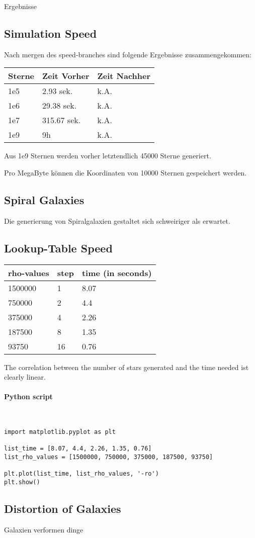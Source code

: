 Ergebnisse

\subsection{Simulation Speed}

Nach mergen des speed-branches sind folgende Ergebnisse zusammengekommen:

\begin{tabular}{l | l | l}

Sterne  & Zeit Vorher   & Zeit Nachher \\ \hline\hline
1e5     & 2.93 sek.     & k.A. \\
1e6     & 29.38 sek.    & k.A. \\
1e7     & 315.67 sek.   & k.A. \\
1e9     & 9h            & k.A. \\

\end{tabular}

Aus 1e9 Sternen werden vorher letztendlich 45000 Sterne generiert.

Pro MegaByte können die Koordinaten von 10000 Sternen gespeichert werden.

\subsection{Spiral Galaxies}

Die generierung von Spiralgalaxien gestaltet sich schweiriger als erwartet.

\subsection{Lookup-Table Speed}

\begin{tabular}{l | l | l}
rho-values  & step  & time (in seconds) \\ \hline\hline
1500000     & 1     & 8.07  \\
750000      & 2     & 4.4   \\
375000      & 4     & 2.26  \\
187500      & 8     & 1.35  \\
93750       & 16    & 0.76  \\
\end{tabular}

The correlation between the number of stars generated and the time needed ist
clearly linear.

\paragraph{Python script} ~\\
\lstset{language=Python}
\begin{lstlisting}[frame = single]
import matplotlib.pyplot as plt

list_time = [8.07, 4.4, 2.26, 1.35, 0.76]
list_rho_values = [1500000, 750000, 375000, 187500, 93750]

plt.plot(list_time, list_rho_values, '-ro')
plt.show()
\end{lstlisting}

\subsection{Distortion of Galaxies}

Galaxien verformen dinge
